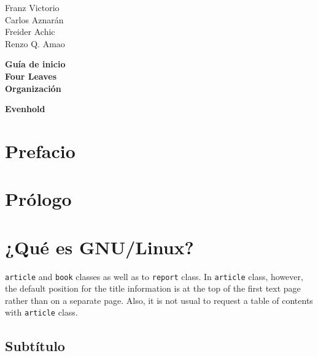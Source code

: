 \documentclass[11pt, oneside]{book}
\begin{document}
\begin{titlepage}
\raggedleft %
\vspace*{\baselineskip} %

{\Large Franz Victorio \\ Carlos Aznarán \\ Freider Achic \\ Renzo Q. Amao \\ } \vspace*{0.167\textheight}


\textbf{\LARGE  Guía de inicio }\\[\baselineskip]

{{\Huge \bf Four Leaves}}\\[\baselineskip]

{\large \bf Organización}

\vfill %

{\large\bf Evenhold }
\vspace{3\baselineskip} %

\end{titlepage}
\tableofcontents

\chapter*{Prefacio}
\lipsum[1]

\chapter*{Prólogo}
\lipsum[1]

\chapter{¿Qué es GNU/Linux?}
\lipsum[1] \texttt{article} and \texttt{book} classes as well as to \texttt{report} class. In \texttt{article} class, however, the default position for the title information is at the top of the first text page rather than on a separate page. Also, it is not usual to request a table of contents with \texttt{article} class.

\section{Subtítulo}
\end{document}
